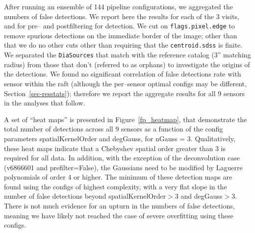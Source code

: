 \documentclass[prd, nofootinbib, floatfix, 11pt,tightenlines,times]{article}
\begin{document}
After running an ensemble of 144 pipeline configurations, we
aggregated the numbers of false detections.  We report here the results for
each of the 3 visits, and for pre-- and postfiltering for
detection.  We cut on {\tt flags.pixel.edge} to remove spurious
detections on the immediate border of the image; other than that we do
no other cuts other than requiring that the {\tt centroid.sdss} is
finite.  We separated the {\tt DiaSources} that match with the reference
catalog (3'' matching radius) from those that don't (referred to as
orphans) to investigate the origins of the detections.  We found no
significant correlation of false detections rate with sensor within the
raft (although the per--sensor optimal configs may be different, Section~\ref{sec-resstats}); 
therefore we report the aggregate results for all 9 sensors in
the analyses that follow.

A set of ``heat maps'' is presented in Figure~\ref{fp_heatmap}, that
demonstrate the total number of detections across all 9 sensors as a
function of the config parameters spatialKernelOrder and degGauss, for
nGauss = 3.  Qualitatively, these heat maps indicate that a Chebyshev
spatial order greater than 3 is required for all data.  In addition,
with the exception of the deconvolution case (v6866601 and
prefilter=False), the Gaussians need to be modified by Laguerre
polynomials of order 4 or higher.  The minimum of these detection maps
are found using the configs of highest complexity, with a very flat
slope in the number of false detections beyond spatialKernelOrder$>$3
and degGauss$>$3.  There is not much evidence for an upturn in the
numbers of false detections, meaning we have likely not reached the
case of severe overfitting using these configs.
\end{document}
